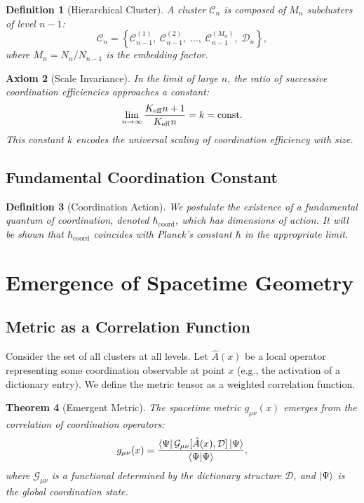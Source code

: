 \documentclass[12pt,a4paper]{article}
\newtheorem{theorem}{Theorem}[section]
\newtheorem{definition}[theorem]{Definition}
\newtheorem{axiom}[theorem]{Axiom}
\newcommand{\Keff}[1][]{K_{\mathrm{eff}\if\relax\detokenize{#1}\relax\else,#1\fi}}   %
\newcommand{\hcoord}{\hbar_{\mathrm{coord}}}
\newcommand{\cC}{\mathcal{C}}
\begin{document}
	\begin{definition}[Hierarchical Cluster]
		A cluster $\cC_n$ is composed of $M_n$ subclusters of level $n-1$:
		\begin{equation}
			\cC_n = \left\{ \cC_{n-1}^{(1)},\; \cC_{n-1}^{(2)},\; \dots,\; \cC_{n-1}^{(M_n)},\; \mathcal{D}_n \right\},
			\label{eq:hierarchy}
		\end{equation}
		where $M_n = N_n / N_{n-1}$ is the embedding factor.
	\end{definition}
	
	\begin{axiom}[Scale Invariance]
		In the limit of large $n$, the ratio of successive coordination efficiencies approaches a constant:
		\begin{equation}
			\lim_{n\to\infty} \frac{\Keff{n+1}}{\Keff{n}} = k = \text{const}.
			\label{eq:scale-invariance}
		\end{equation}
		This constant $k$ encodes the universal scaling of coordination efficiency with size.
	\end{axiom}
	
	\subsection{Fundamental Coordination Constant}
	
	\begin{definition}[Coordination Action]
		We postulate the existence of a fundamental quantum of coordination, denoted $\hcoord$, which has dimensions of action. It will be shown that $\hcoord$ coincides with Planck's constant $\hbar$ in the appropriate limit.
	\end{definition}
	
	\section{Emergence of Spacetime Geometry}
	
	\subsection{Metric as a Correlation Function}
	
	Consider the set of all clusters at all levels. Let $\hat{A}(x)$ be a local operator representing some coordination observable at point $x$ (e.g., the activation of a dictionary entry). We define the metric tensor as a weighted correlation function.
	
	\begin{theorem}[Emergent Metric]
		The spacetime metric $g_{\mu\nu}(x)$ emerges from the correlation of coordination operators:
		\begin{equation}
			g_{\mu\nu}(x) = \frac{ \bra{\Psi} \mathcal{G}_{\mu\nu}[ \hat{A}(x), \mathcal{D}] \ket{\Psi} }{ \braket{\Psi|\Psi} },
			\label{eq:metric}
		\end{equation}
		where $\mathcal{G}_{\mu\nu}$ is a functional determined by the dictionary structure $\mathcal{D}$, and $\ket{\Psi}$ is the global coordination state.
	\end{theorem}
	
\end{document}
